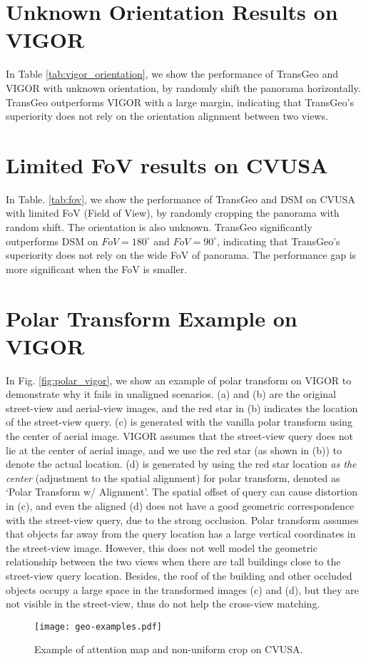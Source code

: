 \documentclass[10pt,twocolumn,letterpaper]{article}
\begin{document}
\section{Unknown Orientation Results on VIGOR}
In Table \ref{tab:vigor_orientation}, we show the performance of TransGeo and VIGOR \cite{zhu2021vigor} with unknown orientation, by randomly shift the panorama horizontally. TransGeo outperforms VIGOR with a large margin, indicating that TransGeo's superiority does not rely on the orientation alignment between two views. 

\section{Limited FoV results on CVUSA}
\label{sec:fov}
In Table. \ref{tab:fov}, we show the performance of TransGeo and DSM \cite{shi2020looking} on CVUSA with limited FoV (Field of View), by randomly cropping the panorama with random shift. The orientation is also unknown.  TransGeo significantly outperforms DSM on $FoV=180^{\circ}$ and $FoV=90^{\circ}$, indicating that TransGeo's superiority does not rely on the wide FoV of panorama. The performance gap is more significant when the FoV is smaller. 

\section{Polar Transform Example on VIGOR}
\label{sec:polar}
In Fig. \ref{fig:polar_vigor}, we show an example of polar transform on VIGOR to demonstrate why it fails in unaligned scenarios. (a) and (b) are the original street-view and aerial-view images, and the red star in (b) indicates the location of the street-view query. (c) is generated with the vanilla polar transform using the center of aerial image. VIGOR assumes that the street-view query does not lie at the center of aerial image, and we use the red star (as shown in (b)) to denote the actual location. (d) is generated by using the red star location \textit{as the center} (\ie adjustment to the spatial alignment) for polar transform, denoted as `Polar Transform w/ Alignment'. The spatial offset of query can cause distortion in (c), and even the aligned (d) does not have a good geometric correspondence with the street-view query, due to the strong occlusion. Polar transform assumes that objects far away from the query location has a large vertical coordinates in the street-view image. However, this does not well model the geometric relationship between the two views when there are tall buildings close to the street-view query location. Besides, the roof of the building and other occluded objects occupy a large space in the transformed images (c) and (d), but they are not visible in the street-view, thus do not help the cross-view matching. 
\begin{figure}[!htbp]
    \centering
    \texttt{[image: geo-examples.pdf]}
    \caption{Example of attention map and non-uniform crop on CVUSA.}
    \label{fig:crop_cvusa}
\end{figure}
\end{document}
